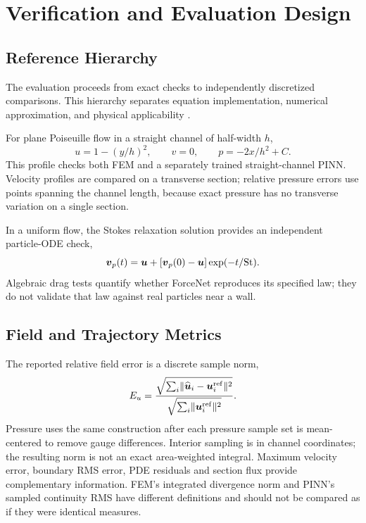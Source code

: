 \chapter{Verification and Evaluation Design}
\label{ch:verification}
\section{Reference Hierarchy}
The evaluation proceeds from exact checks to independently discretized
comparisons. This hierarchy separates equation implementation, numerical
approximation, and physical applicability \cite{roache1998}.

For plane Poiseuille flow in a straight channel of half-width $h$,
\begin{equation}
 u=1-(y/h)^2,\qquad v=0,\qquad p=-2x/h^2+C.
 \label{eq:poiseuille}
\end{equation}
This profile checks both FEM and a separately trained straight-channel PINN.
Velocity profiles are compared on a transverse section; relative pressure
errors use points spanning the channel length, because exact pressure has
no transverse variation on a single section.

In a uniform flow, the Stokes relaxation solution provides an independent
particle-ODE check,
\begin{equation}
 \boldsymbol{v}_p(t)=\boldsymbol{u}+
 [\boldsymbol{v}_p(0)-\boldsymbol{u}]\exp(-t/\mathrm{St}).
 \label{eq:relaxation}
\end{equation}
Algebraic drag tests quantify whether ForceNet reproduces its specified law;
they do not validate that law against real particles near a wall.

\section{Field and Trajectory Metrics}
The reported relative field error is a discrete sample norm,
\begin{equation}
 E_u=\frac{\sqrt{\sum_i\lVert\widehat{\boldsymbol{u}}_i-\boldsymbol{u}_i^{\rm ref}\rVert^2}}
 {\sqrt{\sum_i\lVert\boldsymbol{u}_i^{\rm ref}\rVert^2}}.
 \label{eq:relative-error}
\end{equation}
Pressure uses the same construction after each pressure sample set is
mean-centered to remove gauge differences. Interior sampling is in channel
coordinates; the resulting norm is not an exact area-weighted integral.
Maximum velocity error, boundary RMS error, PDE residuals and section flux
provide complementary information. FEM's integrated divergence norm and
PINN's sampled continuity RMS have different definitions and should not be
compared as if they were identical measures.

